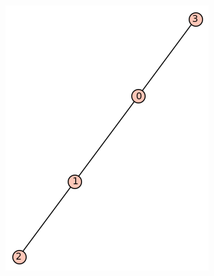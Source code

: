 \documentclass[12pt, a4paper]{article}
\begin{document}
\begin{figure}[h!]
\centering
\includegraphics[width=\linewidth]{t-3}
\end{figure} \\
\end{document}
